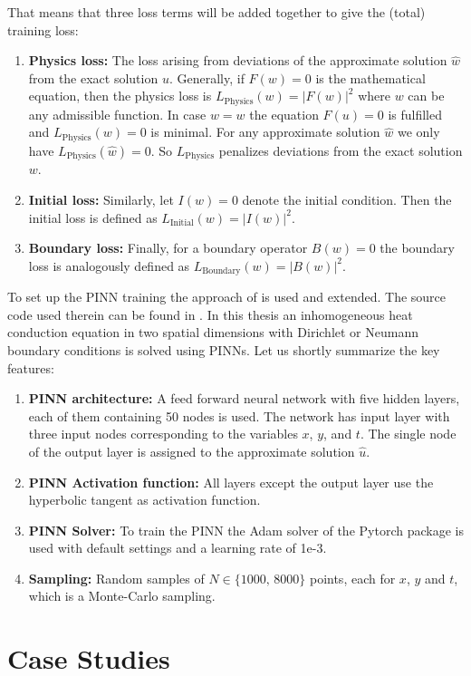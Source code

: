 \documentclass[a4paper,11pt]{article}
\theoremstyle{plain} %
\theoremstyle{definition} %
\theoremstyle{remark} %
\def\uTemp{u}
\def\uTemp{w}
\begin{document}
That means that three loss terms will be added together to give the (total) training loss:
\begin{enumerate}
\item {\bf Physics loss:} The loss arising from deviations of the approximate solution $\hat{\uTemp}$ from the exact solution $u$. Generally, if $F(\uTemp) = 0$ is the mathematical equation, then the physics loss is $L_{\mathrm{Physics}} (w) = |F(w)|^2 $ where $w$ can be any admissible function. In case $w=\uTemp$ the equation $F(u) = 0$ is fulfilled and $L_{\mathrm{Physics}} (\uTemp) = 0 $ is minimal. For any approximate solution $\hat{\uTemp} $ we only have $L_{\mathrm{Physics}} (\hat{\uTemp}) = 0 $. So $L_{\mathrm{Physics}} $ penalizes deviations from the exact solution $\uTemp$.
\item {\bf Initial loss:} Similarly, let $I(\uTemp) = 0$ denote the initial condition. Then the initial loss is defined as $L_{\mathrm{Initial}} (w) = |I(w)|^2 $.
\item {\bf Boundary loss:} Finally, for a boundary operator $B(\uTemp) =0 $ the boundary loss is analogously defined as $L_{\mathrm{Boundary}} (w) = |B(w)|^2 $.
\end{enumerate}
To set up the PINN training the approach of \cite{aryal2024a} is used and extended. The source code used therein can be found in \cite{aryal2024b}. In this thesis an inhomogeneous heat conduction equation in two spatial dimensions with Dirichlet or Neumann boundary conditions is solved using PINNs. Let us shortly summarize the key features:
\begin{enumerate}
\item {\bf PINN architecture:} A feed forward neural network with five hidden layers, each of them containing 50 nodes is used. The network has input layer with three input nodes corresponding to the variables $x$, $y$, and $t$. The single node of the output layer is assigned to the approximate solution $\hat{u}$. 
\item {\bf PINN Activation function:} All layers except the output layer use the hyperbolic tangent as activation function.
\item {\bf PINN Solver:} To train the PINN the Adam solver of the Pytorch package is used with default settings and a learning rate of 1e-3.
\item {\bf Sampling:} Random samples of $N \in \{ 1000,\, 8000 \} $ points, each for $x$, $y$ and $t$, which is a Monte-Carlo sampling.
\end{enumerate}
\section{Case Studies}
\end{document}

